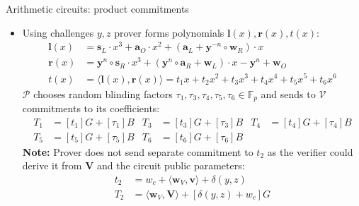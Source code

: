 \documentclass{zkdl-presentation-template}
\begin{document}
    \begin{frame}{Arithmetic circuits: product commitments}
        \begin{itemize}
            \item Using challenges $y,z$ prover forms polynomials $\mathbf{l}(x), \mathbf{r}(x), t(x)$:
            \begin{equation*}
                \begin{aligned}
                    \mathbf{l}(x) &= \mathbf{s}_L \cdot x^3 + \mathbf{a}_O \cdot x^2 + (\mathbf{a}_L + \mathbf{y}^{-n} \circ \mathbf{w}_R) \cdot x \\
                    \mathbf{r}(x) &= \mathbf{y}^n \circ \mathbf{s}_R \cdot x^3 + (\mathbf{y}^n \circ \mathbf{a}_R +  \mathbf{w}_L) \cdot x - \mathbf{y}^n + \mathbf{w}_O \\
                    t(x) &= \langle \mathbf{l}(x), \mathbf{r}(x) \rangle = t_1 x + t_2 x^2 + t_3 x^3 + t_4 x^4 + t_5 x^5 + t_6 x^6
                \end{aligned}
            \end{equation*}
            \pause
            $\mathcal{P}$ chooses random blinding factors $\tau_1, \tau_3, \tau_4, \tau_5, \tau_6 \in \mathbb{F}_p$ and sends to $\mathcal{V}$ commitments to its coefficients:
            \begin{equation*}
                \begin{aligned}
                    T_1 &= [t_1]G + [\tau_1]B &
                    T_3 &= [t_3]G + [\tau_3]B &
                    T_4 &= [t_4]G + [\tau_4]B\\
                    T_5 &= [t_5]G + [\tau_5]B &
                    T_6 &= [t_6]G + [\tau_6]B &
                \end{aligned}
            \end{equation*}
            \pause
            \textbf{Note:} Prover does not send separate commitment to $t_2$ as the verifier could derive it from $\mathbf{V}$ and the circuit public parameters:
            \begin{align*}
                t_2 &= w_c + \langle \mathbf{w}_V, \mathbf{v} \rangle + \delta(y, z) \\
                T_2 &= \langle \mathbf{w}_V, \mathbf{V} \rangle + [\delta(y, z) + w_c]G
            \end{align*}
        \end{itemize}
    \end{frame}
\end{document}
